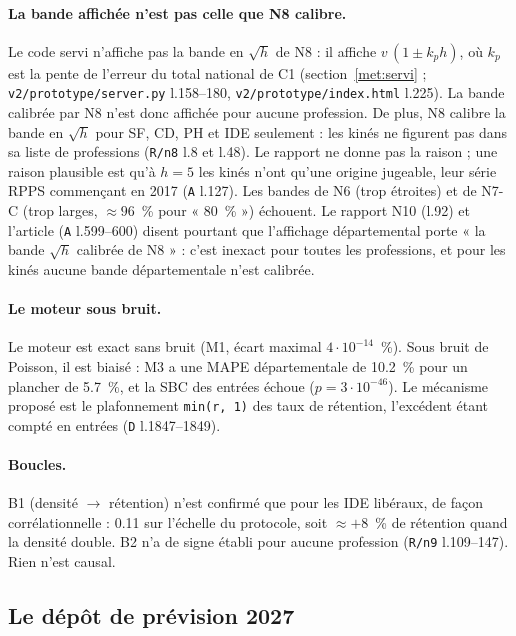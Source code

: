 \paragraph{La bande affichée n'est pas celle que N8 calibre.} Le code servi n'affiche pas la bande en
$\sqrt h$ de N8 : il affiche $v\,(1 \pm k_p h)$, où $k_p$ est la pente de l'erreur du total national de
C1 (section~\ref{met:servi} ; \texttt{v2/prototype/server.py} l.158--180,
\texttt{v2/prototype/index.html} l.225). La bande calibrée par N8 n'est donc affichée pour aucune
profession. De plus, N8 calibre la bande en $\sqrt h$ pour SF, CD, PH et IDE seulement : les kinés ne figurent pas dans sa liste de professions (\texttt{R/n8} l.8
et l.48). Le rapport ne donne pas la raison ; une raison plausible est qu'à $h = 5$ les kinés n'ont
qu'une\derive{} origine jugeable, leur série RPPS commençant en 2017 (\texttt{A} l.127). Les bandes de N6 (trop étroites) et de N7-C (trop
larges, $\approx 96$\mesure{}~\% pour « 80~\% ») échouent. Le rapport N10 (l.92) et l'article
(\texttt{A} l.599--600) disent pourtant que l'affichage départemental porte « la bande $\sqrt h$
calibrée de N8 » : c'est inexact pour toutes les professions, et pour les kinés aucune bande
départementale n'est calibrée.

\paragraph{Le moteur sous bruit.} Le moteur est exact sans bruit (M1, écart maximal
$4\cdot10^{-14}$\mesure{}~\%). Sous bruit de Poisson, il est biaisé : M3 a une MAPE départementale
de \num{10.2}\mesure{}~\% pour un plancher de \num{5.7}\derive{}~\%, et la SBC des entrées échoue
($p = 3\cdot10^{-46}$\mesure). Le mécanisme proposé est le plafonnement \texttt{min(r, 1)} des taux
de rétention, l'excédent étant compté en entrées (\texttt{D} l.1847--1849).

\paragraph{Boucles.} B1 (densité $\to$ rétention) n'est confirmé que pour les IDE libéraux, de façon
corrélationnelle : \num{+0.11}\mesure{} sur l'échelle du protocole, soit $\approx +8$\derive{}~\% de
rétention quand la densité double. B2 n'a de signe établi pour aucune profession
(\texttt{R/n9} l.109--147). Rien n'est causal.

\subsection{Le dépôt de prévision 2027}\label{val:depot}

